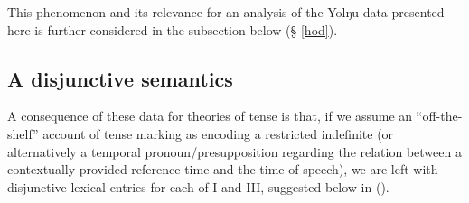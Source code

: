 This phenomenon and its relevance for an analysis of the Yolŋu data presented here is  further considered in the subsection below (§ \ref{hod}).





\subsection{A disjunctive semantics}
A consequence of these data for theories of tense is that, if we assume an ``off-the-shelf'' account of tense marking as encoding a restricted indefinite (or alternatively a temporal pronoun/presupposition regarding the relation between a contextually-provided reference time and the time of speech), we are left with disjunctive lexical entries for each of \gls{I} and \gls{III}, suggested below in (\nextx).


%
%
%

